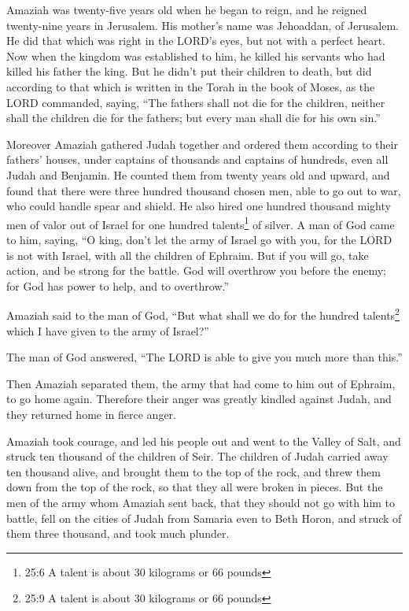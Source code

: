 \mychapter{} \myverse*{}Amaziah was twenty-five years old when he began to reign, and
he reigned twenty-nine years in Jerusalem. His mother’s name was Jehoaddan, of Jerusalem.
\myverse{}He did that which was right in the LORD’s eyes, but not with a perfect heart.
\myverse{}Now when the kingdom was established to him, he killed his servants who had
killed his father the king.
\myverse{}But he didn’t put their children to death, but did according to that which
is written in the Torah in the book of Moses, as the LORD commanded, saying, “The fathers shall not die
for the children, neither shall the children die for the fathers; but every man shall die for his own
sin.”

\myverse{}Moreover Amaziah gathered Judah together and ordered them according
to their fathers’ houses, under captains of thousands and captains of hundreds, even all Judah and Benjamin.
He counted them from twenty years old and upward, and found that there were three hundred thousand chosen
men, able to go out to war, who could handle spear and shield.
\myverse{}He also hired one hundred thousand mighty men of valor out of Israel for one
hundred talents\footnote{25:6 A talent is about 30 kilograms or 66 pounds} of silver.
\myverse{}A man of God came to him, saying, “O king, don’t let the army of Israel go
with you, for the LORD is not with Israel, with all the children of Ephraim.
\myverse{}But if you will go, take action, and be strong for the battle. God will overthrow
you before the enemy; for God has power to help, and to overthrow.”

\myverse{}Amaziah said to the man of God, “But what shall we do for the
hundred talents\footnote{25:9 A talent is about 30 kilograms or 66 pounds} which I have given to the army of Israel?”

The man of God answered, “The LORD is able to give you much more than this.”

\myverse{}Then Amaziah separated them, the army that had come to him out
of Ephraim, to go home again. Therefore their anger was greatly kindled against Judah, and they returned
home in fierce anger.

\myverse{}Amaziah took courage, and led his people out and went to the
Valley of Salt, and struck ten thousand of the children of Seir.
\myverse{}The children of Judah carried away ten thousand alive, and brought them to
the top of the rock, and threw them down from the top of the rock, so that they all were broken in pieces.
\myverse{}But the men of the army whom Amaziah sent back, that they should not go with
him to battle, fell on the cities of Judah from Samaria even to Beth Horon, and struck of them three thousand,
and took much plunder.


